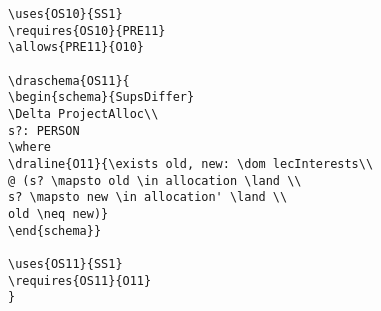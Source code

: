 \begin{verbatim}
\uses{OS10}{SS1}
\requires{OS10}{PRE11}
\allows{PRE11}{O10}

\draschema{OS11}{
\begin{schema}{SupsDiffer}
\Delta ProjectAlloc\\
s?: PERSON
\where
\draline{O11}{\exists old, new: \dom lecInterests\\
@ (s? \mapsto old \in allocation \land \\
s? \mapsto new \in allocation' \land \\
old \neq new)}
\end{schema}}

\uses{OS11}{SS1}
\requires{OS11}{O11}
}


\end{verbatim}